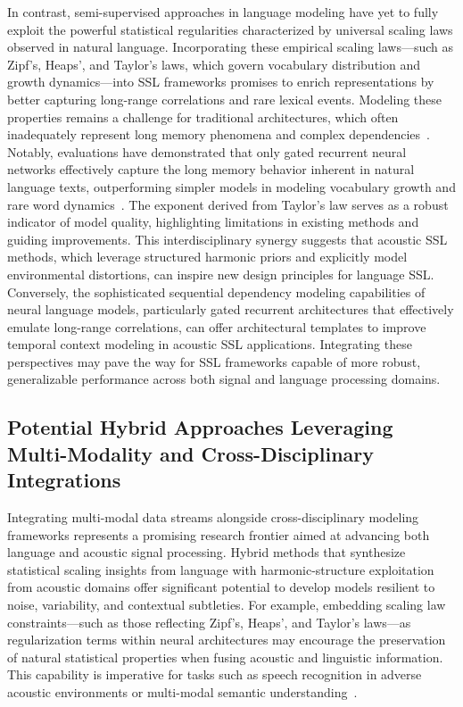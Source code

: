 \documentclass[sigconf]{acmart}
\begin{document}
In contrast, semi-supervised approaches in language modeling have yet to fully exploit the powerful statistical regularities characterized by universal scaling laws observed in natural language. Incorporating these empirical scaling laws—such as Zipf's, Heaps', and Taylor's laws, which govern vocabulary distribution and growth dynamics—into SSL frameworks promises to enrich representations by better capturing long-range correlations and rare lexical events. Modeling these properties remains a challenge for traditional architectures, which often inadequately represent long memory phenomena and complex dependencies~\cite{ref51}. Notably, evaluations have demonstrated that only gated recurrent neural networks effectively capture the long memory behavior inherent in natural language texts, outperforming simpler models in modeling vocabulary growth and rare word dynamics~\cite{ref51}. The exponent derived from Taylor's law serves as a robust indicator of model quality, highlighting limitations in existing methods and guiding improvements. This interdisciplinary synergy suggests that acoustic SSL methods, which leverage structured harmonic priors and explicitly model environmental distortions, can inspire new design principles for language SSL. Conversely, the sophisticated sequential dependency modeling capabilities of neural language models, particularly gated recurrent architectures that effectively emulate long-range correlations, can offer architectural templates to improve temporal context modeling in acoustic SSL applications. Integrating these perspectives may pave the way for SSL frameworks capable of more robust, generalizable performance across both signal and language processing domains.

\subsection{Potential Hybrid Approaches Leveraging Multi-Modality and Cross-Disciplinary Integrations}

Integrating multi-modal data streams alongside cross-disciplinary modeling frameworks represents a promising research frontier aimed at advancing both language and acoustic signal processing. Hybrid methods that synthesize statistical scaling insights from language with harmonic-structure exploitation from acoustic domains offer significant potential to develop models resilient to noise, variability, and contextual subtleties. For example, embedding scaling law constraints—such as those reflecting Zipf's, Heaps', and Taylor's laws—as regularization terms within neural architectures may encourage the preservation of natural statistical properties when fusing acoustic and linguistic information. This capability is imperative for tasks such as speech recognition in adverse acoustic environments or multi-modal semantic understanding~\cite{ref51,ref52}.
\end{document}

